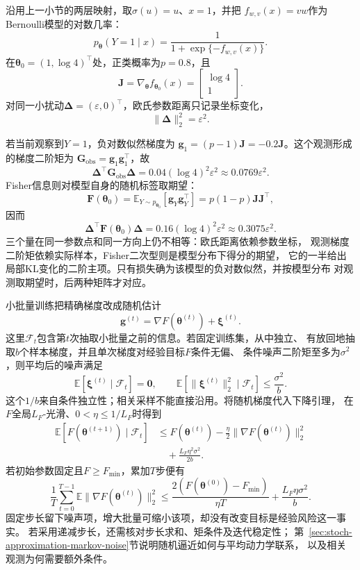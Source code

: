\begin{example}[同一参数点上的三种二次量]
  \label{ex:future-parameter-second-moment-fisher}
  沿用上一小节的两层映射，取\(\sigma(u)=u\)、\(x=1\)，并把
  \(f_{w,v}(x)=vw\)作为Bernoulli模型的对数几率：
  \[
    p_{\bm\theta}(Y=1\mid x)
    =
    \frac{1}{1+\exp\{-f_{w,v}(x)\}}.
  \]
  在\(\bm\theta_0=(1,\log4)^{\top}\)处，正类概率为\(p=0.8\)，且
  \[
    \bm J
    =
    \nabla_{\bm\theta}f_{\bm\theta_0}(x)
    =
    \begin{bmatrix}\log4\\1\end{bmatrix}.
  \]
  对同一小扰动\(\bm\Delta=(\varepsilon,0)^{\top}\)，欧氏参数距离只记录坐标变化，
  \[
    \lVert\bm\Delta\rVert_2^2=\varepsilon^2.
  \]

  若当前观察到\(Y=1\)，负对数似然梯度为
  \(\bm g_1=(p-1)\bm J=-0.2\bm J\)。这个观测形成的梯度二阶矩为
  \(\bm G_{\mathrm{obs}}=\bm g_1\bm g_1^{\top}\)，故
  \[
    \bm\Delta^{\top}\bm G_{\mathrm{obs}}\bm\Delta
    =
    0.04(\log4)^2\varepsilon^2
    \approx0.0769\varepsilon^2.
  \]
  Fisher信息则对模型自身的随机标签取期望：
  \[
    \bm F(\bm\theta_0)
    =
    \mathbb{E}_{Y\sim p_{\bm\theta_0}}
    [\bm g_Y\bm g_Y^{\top}]
    =
    p(1-p)\bm J\bm J^{\top},
  \]
  因而
  \[
    \bm\Delta^{\top}\bm F(\bm\theta_0)\bm\Delta
    =
    0.16(\log4)^2\varepsilon^2
    \approx0.3075\varepsilon^2.
  \]
  三个量在同一参数点和同一方向上仍不相等：欧氏距离依赖参数坐标，
  观测梯度二阶矩依赖实际样本，Fisher二次型则是模型分布下得分的期望，
  它的一半给出局部KL变化的二阶主项。只有损失确为该模型的负对数似然，并按模型分布
  对观测取期望时，后两种矩阵才对应。
\end{example}

小批量训练把精确梯度改成随机估计
\[
  \bm{g}^{(t)}
  =
  \nabla F(\bm{\theta}^{(t)})
  +
  \bm{\xi}^{(t)}.
\]
这里$\mathcal F_t$包含第$t$次抽取小批量之前的信息。若固定训练集，从中独立、
有放回地抽取$b$个样本梯度，并且单次梯度对经验目标$F$条件无偏、
条件噪声二阶矩至多为$\sigma^2$，则平均后的噪声满足
\[
  \mathbb E[\bm\xi^{(t)}\mid\mathcal F_t]=\bm0,
  \qquad
  \mathbb E[\|\bm\xi^{(t)}\|_2^2\mid\mathcal F_t]\leq \frac{\sigma^2}{b}.
\]
这个$1/b$来自条件独立性；相关采样不能直接沿用。将随机梯度代入下降引理，
在$F$全局$L_F$-光滑、$0<\eta\leq1/L_F$时得到
\[
  \begin{aligned}
    \mathbb E[F(\bm\theta^{(t+1)})\mid\mathcal F_t]
    &\leq F(\bm\theta^{(t)})
    -\frac{\eta}{2}\|\nabla F(\bm\theta^{(t)})\|_2^2\\
    &\quad+\frac{L_F\eta^2\sigma^2}{2b}.
  \end{aligned}
\]
若初始参数固定且$F\geq F_{\min}$，累加$T$步便有
\[
  \frac1T\sum_{t=0}^{T-1}\mathbb E\|\nabla F(\bm\theta^{(t)})\|_2^2
  \leq
  \frac{2(F(\bm\theta^{(0)})-F_{\min})}{\eta T}
  +\frac{L_F\eta\sigma^2}{b}.
\]
固定步长留下噪声项，增大批量可缩小该项，却没有改变目标是经验风险这一事实。
若采用递减步长，还需核对步长求和、矩条件及迭代稳定性；
第~\ref{sec:stoch-approximation-markov-noise}节说明随机逼近如何与平均动力学联系，
以及相关观测为何需要额外条件。


